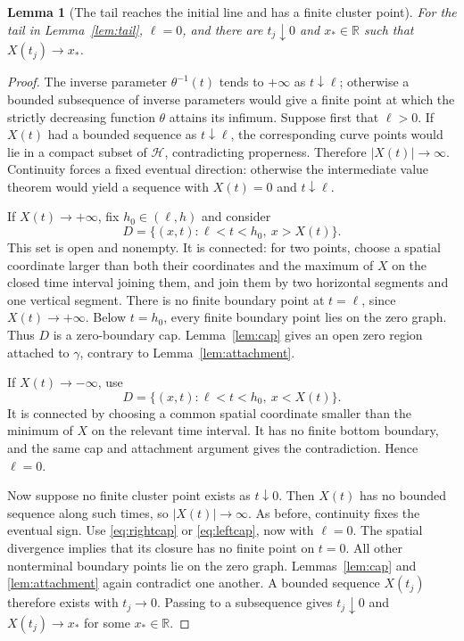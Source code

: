 \documentclass[11pt,reqno]{amsart}
\numberwithin{equation}{section}
\newtheorem{lemma}[theorem]{Lemma}
\theoremstyle{definition}
\theoremstyle{remark}
\newcommand{\R}{\mathbb R}
\newcommand{\HH}{\mathcal H}
\begin{document}
\begin{lemma}[The tail reaches the initial line and has a finite cluster point]\label{lem:finite}
For the tail in Lemma~\ref{lem:tail}, $\ell=0$, and there are $t_j\downarrow0$ and $x_*\in\R$ such that $X(t_j)\to x_*$.
\end{lemma}
\begin{proof}
The inverse parameter $\theta^{-1}(t)$ tends to $+\infty$ as $t\downarrow\ell$; otherwise a bounded subsequence of inverse parameters would give a finite point at which the strictly decreasing function $\theta$ attains its infimum. Suppose first that $\ell>0$. If $X(t)$ had a bounded sequence as $t\downarrow\ell$, the corresponding curve points would lie in a compact subset of $\HH$, contradicting properness. Therefore $|X(t)|\to\infty$. Continuity forces a fixed eventual direction: otherwise the intermediate value theorem would yield a sequence with $X(t)=0$ and $t\downarrow\ell$.

If $X(t)\to+\infty$, fix $h_0\in(\ell,h)$ and consider
\begin{equation}\label{eq:rightcap}
 D=\{(x,t):\ell<t<h_0,\ x>X(t)\}.
\end{equation}
This set is open and nonempty. It is connected: for two points, choose a spatial coordinate larger than both their coordinates and the maximum of $X$ on the closed time interval joining them, and join them by two horizontal segments and one vertical segment. There is no finite boundary point at $t=\ell$, since $X(t)\to+\infty$. Below $t=h_0$, every finite boundary point lies on the zero graph. Thus $D$ is a zero-boundary cap. Lemma~\ref{lem:cap} gives an open zero region attached to $\gamma$, contrary to Lemma~\ref{lem:attachment}.

If $X(t)\to-\infty$, use
\begin{equation}\label{eq:leftcap}
 D=\{(x,t):\ell<t<h_0,\ x<X(t)\}.
\end{equation}
It is connected by choosing a common spatial coordinate smaller than the minimum of $X$ on the relevant time interval. It has no finite bottom boundary, and the same cap and attachment argument gives the contradiction. Hence $\ell=0$.

Now suppose no finite cluster point exists as $t\downarrow0$. Then $X(t)$ has no bounded sequence along such times, so $|X(t)|\to\infty$. As before, continuity fixes the eventual sign. Use \eqref{eq:rightcap} or \eqref{eq:leftcap}, now with $\ell=0$. The spatial divergence implies that its closure has no finite point on $t=0$. All other nonterminal boundary points lie on the zero graph. Lemmas~\ref{lem:cap} and \ref{lem:attachment} again contradict one another. A bounded sequence $X(t_j)$ therefore exists with $t_j\to0$. Passing to a subsequence gives $t_j\downarrow0$ and $X(t_j)\to x_*$ for some $x_*\in\R$.
\end{proof}
\end{document}
